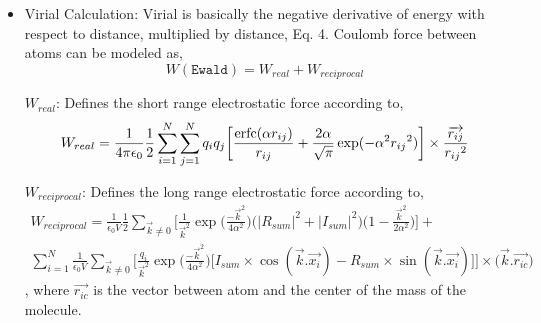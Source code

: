 \begin{itemize}
\item Virial Calculation: Virial is basically the negative derivative of energy with respect to distance, multiplied by distance, Eq. 4. Coulomb force between atoms can be modeled as,\\

	\begin{equation}
		W(\texttt{Ewald}) = W_{real} + W_{reciprocal} 
	\end{equation}
	
	$W_{real}$: Defines the short range electrostatic force according to,
	\begin{equation}
		W_{real} = \frac{1}{4\pi \epsilon_0} \frac{1}{2} \sum_{i =1}^{N} \sum_{j = 1}^{N} q_i q_j  \bigg[ \frac{\operatorname{erfc}(\alpha r_{ij})}{r_{ij}} + \frac{2\alpha}{ \sqrt{\pi}} \exp(-\alpha^2 {r_{ij}}^2) \bigg] \times \frac{\overrightarrow{r_{ij}}}{{r_{ij}}^2}
	\end{equation}
	
	$W_{reciprocal}$: Defines the long range electrostatic force according to,
	\begin{equation}
	\begin{split}
		W_{reciprocal} = \frac{1}{\epsilon_0 V} \frac {1}{2} \sum_{\overrightarrow{k} \ne 0}^{} \Bigg[\frac {1}{\overrightarrow{k}^2}\exp\bigg(\frac {-\overrightarrow{k}^2}{4 \alpha^2}\bigg) \bigg( {\Big| R_{sum} \Big|}^2 + {\Big| I_{sum} \Big|}^2 \bigg) \bigg(  1 - \frac{\overrightarrow{k}^2}{2\alpha^2} \bigg) \Bigg] +\\ 
\sum_{i=1}^{N} \frac{1}{\epsilon_0 V}  \sum_{\overrightarrow{k} \ne 0}^{} \Bigg[ \frac {q_i}{\overrightarrow{k}^2}\exp\bigg(\frac {-\overrightarrow{k}^2}{4 \alpha^2}\bigg) \bigg[ I_{sum} \times\cos(\overrightarrow{k}.\overrightarrow{x_i})  - R_{sum} \times \sin(\overrightarrow{k}.\overrightarrow{x_i}) \bigg] \Bigg] \times \big( \overrightarrow{k}.\overrightarrow{r_{ic}} \big)
	\end{split}
	\end{equation}
	, where $\overrightarrow{r_{ic}}$ is the vector between atom and the center of the mass of the molecule.
\end{itemize}

